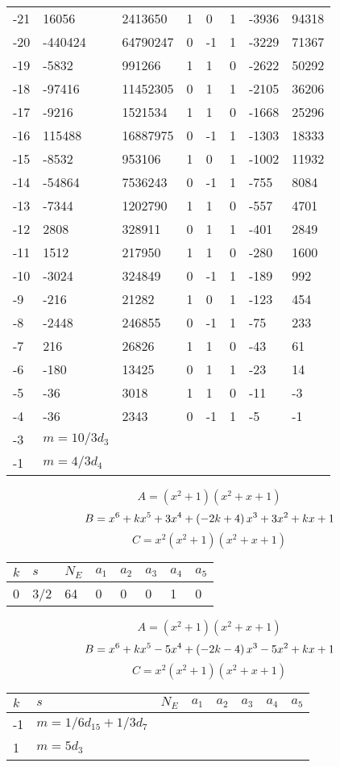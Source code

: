 \documentclass{amsart}
\begin{document}
\begin{longtable}{|l|l|l|lllll|}
-21&16056&2413650&1&0&1&-3936&94318\\
-20&-440424&64790247&0&-1&1&-3229&71367\\
-19&-5832&991266&1&1&0&-2622&50292\\
-18&-97416&11452305&0&1&1&-2105&36206\\
-17&-9216&1521534&1&1&0&-1668&25296\\
-16&115488&16887975&0&-1&1&-1303&18333\\
-15&-8532&953106&1&0&1&-1002&11932\\
-14&-54864&7536243&0&-1&1&-755&8084\\
-13&-7344&1202790&1&1&0&-557&4701\\
-12&2808&328911&0&1&1&-401&2849\\
-11&1512&217950&1&1&0&-280&1600\\
-10&-3024&324849&0&-1&1&-189&992\\
-9&-216&21282&1&0&1&-123&454\\
-8&-2448&246855&0&-1&1&-75&233\\
-7&216&26826&1&1&0&-43&61\\
-6&-180&13425&0&1&1&-23&14\\
-5&-36&3018&1&1&0&-11&-3\\
-4&-36&2343&0&-1&1&-5&-1\\
-3&$m=10/3d_{3}$&&\multicolumn{5}{c|}{}\\
-1&$m=4/3d_{4}$&&\multicolumn{5}{c|}{}\\
\hline
\end{longtable}
$$A=(x^2
 + 1)(x^2
 + x
 + 1)$$
$$B=x^6
 + k\*x^5
 + 3\*x^4
 + \left(-2\*k
 + 4\right) \*x^3
 + 3\*x^2
 + k\*x
 + 1$$
$$C=x^2(x^2
 + 1)(x^2
 + x
 + 1)$$
\begin{longtable}{|l|l|l|lllll|}
\hline
$k$ & $s$ & $N_E$ & $a_1$ & $a_2$ & $a_3$ & $a_4$ & $a_5$\\
\hline
0&3/2&64&0&0&0&1&0\\
\hline
\end{longtable}
$$A=(x^2
 + 1)(x^2
 + x
 + 1)$$
$$B=x^6
 + k\*x^5
 - 5\*x^4
 + \left(-2\*k
 - 4\right) \*x^3
 - 5\*x^2
 + k\*x
 + 1$$
$$C=x^2(x^2
 + 1)(x^2
 + x
 + 1)$$
\begin{longtable}{|l|l|l|lllll|}
\hline
$k$ & $s$ & $N_E$ & $a_1$ & $a_2$ & $a_3$ & $a_4$ & $a_5$\\
\hline
-1&$m=1/6d_{15}+1/3d_{7}$&&\multicolumn{5}{c|}{}\\
1&$m=5d_{3}$&&\multicolumn{5}{c|}{}\\
\hline
\end{longtable}
\end{document}
